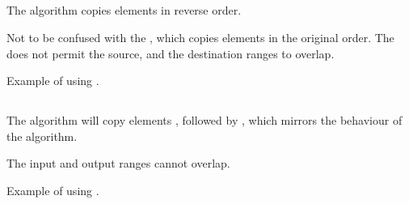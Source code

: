 \subsection{\texorpdfstring{}{\texttt{std::reverse\_copy}}}

The  algorithm copies elements in reverse order.


Not to be confused with the , which copies elements in the original order. The  does not permit the source, and the destination ranges to overlap.

\begin{codebox}[]{\href{https://compiler-explorer.com/z/1YM9WevcT}{\ExternalLink}}
\footnotesize Example of using .
\tcblower
{}
\end{codebox}

\subsection{\texorpdfstring{}{\texttt{std::rotate\_copy}}}

The  algorithm will copy elements \cpp{[middle, last)}, followed by \cpp{[first, middle)}, which mirrors the behaviour of the  algorithm.


The input and output ranges cannot overlap.

\begin{codebox}[]{\href{https://compiler-explorer.com/z/MWf5q3r9d}{\ExternalLink}}
\footnotesize Example of using .
\tcblower
{}
\end{codebox}